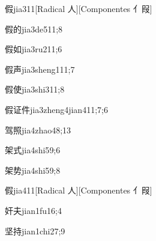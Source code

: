 \begin{verbete}{假}{jia3}{11}[Radical 人][Componentes 亻叚]
\end{verbete}

\begin{verbete}{假的}{jia3de5}{11;8}
\end{verbete}

\begin{verbete}{假如}{jia3ru2}{11;6}
\end{verbete}

\begin{verbete}{假声}{jia3sheng1}{11;7}
\end{verbete}

\begin{verbete}{假使}{jia3shi3}{11;8}
\end{verbete}

\begin{verbete}{假证件}{jia3zheng4jian4}{11;7;6}
\end{verbete}

\begin{verbete}{驾照}{jia4zhao4}{8;13}
\end{verbete}

\begin{verbete}{架式}{jia4shi5}{9;6}
\end{verbete}

\begin{verbete}{架势}{jia4shi5}{9;8}
\end{verbete}

\begin{verbete}{假}{jia4}{11}[Radical 人][Componentes 亻叚]
\end{verbete}

\begin{verbete}{奸夫}{jian1fu1}{6;4}
\end{verbete}

\begin{verbete}{坚持}{jian1chi2}{7;9}
\end{verbete}

